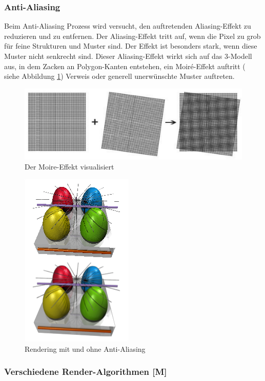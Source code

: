 \subsubsection{Anti-Aliasing}
Beim Anti-Aliasing Prozess wird versucht, den auftretenden Aliasing-Effekt zu reduzieren und zu entfernen. Der Aliasing-Effekt tritt auf, wenn die Pixel zu grob für feine Strukturen und Muster sind. Der Effekt ist besonders stark, wenn diese Muster nicht senkrecht sind. Dieser Aliasing-Effekt wirkt sich auf das 3-Modell aus, in dem Zacken an Polygon-Kanten entstehen, ein Moiré-Effekt auftritt ( siehe Abbildung \ref{fig:impl:MoireEffekt}) Verweis oder generell unerwünschte Muster auftreten.\cite{Rendering3DModels} 
\begin{figure}
    \centering
    \includegraphics[scale=0.3]{pics/moire-effekt.jpg}
    \caption{Der Moire-Effekt visualisiert \cite{MoireEffekt}}
    \label{fig:impl:MoireEffekt}
\end{figure}

\begin{figure}
    \centering
    \includegraphics[scale=0.7]{pics/anti-aliasing.png}
    \caption{Rendering mit und ohne Anti-Aliasing \cite{AntiAliasing}}
    \label{fig:impl:anti-aliasing}
\end{figure}

\subsubsection{Verschiedene Render-Algorithmen [M]}
